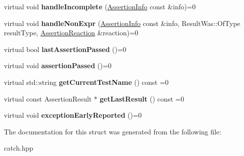 \begin{DoxyCompactItemize}
\item 
\mbox{\label{structCatch_1_1IResultCapture_a89b89372eb09cc44f8dcad363de6157d}} 
virtual void {\bfseries handle\+Incomplete} (\hyperlink{structCatch_1_1AssertionInfo}{Assertion\+Info} const \&info)=0
\item 
\mbox{\label{structCatch_1_1IResultCapture_ab7dbdf8aa28427119583e24dbb302c63}} 
virtual void {\bfseries handle\+Non\+Expr} (\hyperlink{structCatch_1_1AssertionInfo}{Assertion\+Info} const \&info, Result\+Was\+::\+Of\+Type result\+Type, \hyperlink{structCatch_1_1AssertionReaction}{Assertion\+Reaction} \&reaction)=0
\item 
\mbox{\label{structCatch_1_1IResultCapture_a973435fbdcb2f6f07a0ec5719a01e956}} 
virtual bool {\bfseries last\+Assertion\+Passed} ()=0
\item 
\mbox{\label{structCatch_1_1IResultCapture_a9b0ef2cb071e9a9dc6ec1b533026aea7}} 
virtual void {\bfseries assertion\+Passed} ()=0
\item 
\mbox{\label{structCatch_1_1IResultCapture_aea1617f4a84cc648246aa3ed6918b5bf}} 
virtual std\+::string {\bfseries get\+Current\+Test\+Name} () const =0
\item 
\mbox{\label{structCatch_1_1IResultCapture_ab18872c89fab97405a56e9c6a4919736}} 
virtual const Assertion\+Result $\ast$ {\bfseries get\+Last\+Result} () const =0
\item 
\mbox{\label{structCatch_1_1IResultCapture_ae63ecec95db4c236c63ecf616f483810}} 
virtual void {\bfseries exception\+Early\+Reported} ()=0
\end{DoxyCompactItemize}


The documentation for this struct was generated from the following file\+:\begin{DoxyCompactItemize}
\item 
catch.\+hpp\end{DoxyCompactItemize}
